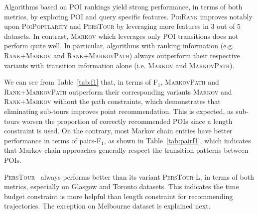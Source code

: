 Algorithms based on POI rankings yield strong performance, in terms of both metrics, by exploring POI and query specific features.
\textsc{PoiRank} improves notably upon \textsc{PoiPopularity} and \textsc{PersTour} by leveraging more features in $3$ out of $5$ datasets.
In contrast, \textsc{Markov} which leverages only POI transitions does not perform quite well.
In particular, algorithms with ranking information (e.g. \textsc{Rank+Markov} and \textsc{Rank+MarkovPath}) 
always outperform their respective variants with transition information alone (i.e. \textsc{Markov} and \textsc{MarkovPath}).


We can see from Table~\ref{tab:f1} that, in terms of F$_1$, \textsc{MarkovPath} and \textsc{Rank+MarkovPath}
outperform their corresponding variants \textsc{Markov} and \textsc{Rank+Markov} without the path constraints,
which demonstrates that eliminating sub-tours improves point recommendation.
This is expected, as sub-tours worsen the proportion of correctly recommended POIs since a length constraint is used.
On the contrary, most Markov chain entries have better performance in terms of pairs-F$_1$, as shown in Table~\ref{tab:pairf1},
which indicates that Markov chain approaches generally respect the transition patterns between POIs.


\textsc{PersTour}~\cite{ijcai15} always performs better than its variant \textsc{PersTour-L},
in terms of both metrics, especially on Glasgow and Toronto datasets.
This indicates the time budget constraint is more helpful than length constraint for recommending trajectories.
The exception on Melbourne dataset is explained next.




